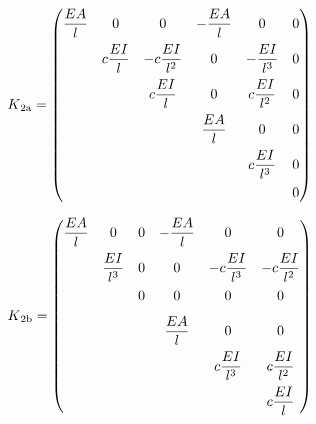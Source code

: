 \begin{equation} \label{K2a}
K\textsubscript{2a} = \begin{pmatrix}
\dfrac{EA}{l} & 0                   & 0                   & -\dfrac{EA}{l}  & 0                   & 0                   \\[0.8em]
              & c\dfrac{EI}{l}      & -c\dfrac{EI}{l^2}   & 0               & -\dfrac{EI}{l^3}    & 0                   \\[0.8em]
              &                     & c\dfrac{EI}{l}      & 0               & c\dfrac{EI}{l^2}    & 0                   \\[0.8em]
              &                     &                     & \dfrac{EA}{l}   & 0                   & 0                   \\[0.8em]
              &                     &                     &                 & c\dfrac{EI}{l^3}    & 0                   \\[0.8em]
              &                     &                     &                 &                     & 0
     \end{pmatrix}
\end{equation}

\begin{equation} \label{K2b}
K\textsubscript{2b} = \begin{pmatrix}
\dfrac{EA}{l} & 0                   & 0                   & -\dfrac{EA}{l}  & 0                   & 0                   \\[0.8em]
              & \dfrac{EI}{l^3}     & 0                   & 0               & -c\dfrac{EI}{l^3}   & -c\dfrac{EI}{l^2}   \\[0.8em]
              &                     & 0                   & 0               & 0                   & 0                   \\[0.8em]
              &                     &                     & \dfrac{EA}{l}   & 0                   & 0                   \\[0.8em]
              &                     &                     &                 & c\dfrac{EI}{l^3}    & c\dfrac{EI}{l^2}    \\[0.8em]
              &                     &                     &                 &                     & c\dfrac{EI}{l}
     \end{pmatrix}
\end{equation}

